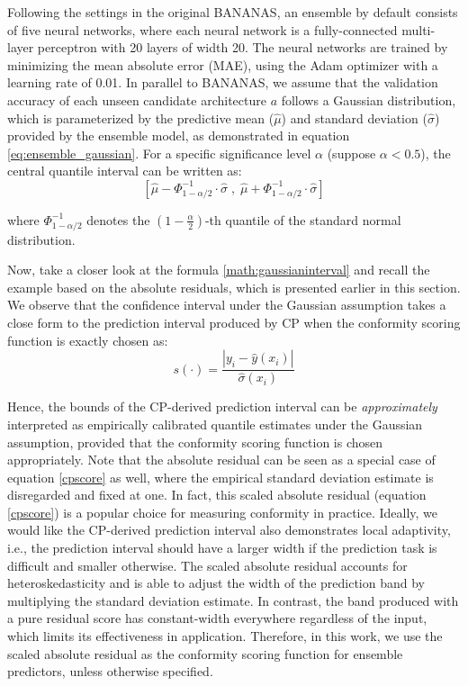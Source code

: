 \documentclass[a4paper,oneside,bibliography=totoc]{scrbook}
\begin{document}
{\begin{description}[leftmargin=0cm]
	\item [Ensemble Predictor] Following the settings in the original BANANAS, an ensemble by default consists of five neural networks, where each neural network is a fully-connected multi-layer perceptron with 20 layers of width 20. The neural networks are trained by minimizing the mean absolute error (MAE), using the Adam optimizer with a learning rate of 0.01. In parallel to BANANAS, we assume that the validation accuracy of each unseen candidate architecture $a$ follows a Gaussian distribution, which is parameterized by the predictive mean ($\hat{\mu}$) and standard deviation ($\hat{\sigma}$) provided by the ensemble model, as demonstrated in equation \ref{eq:ensemble_gaussian}. For a specific significance level $\alpha$ (suppose $\alpha<0.5$), the central quantile interval can be written as:
		\begin{equation}	
	\left[	
		\hat{\mu} - \Phi^{-1}_{1 - \alpha/2} \cdot \hat{\sigma}	\; ,\; 
		\hat{\mu} + \Phi^{-1}_{1 - \alpha/2} \cdot \hat{\sigma}
			\right]
		\label{math:gaussianinterval}
		\end{equation}
		
	where $\Phi^{-1}_{1 - \alpha/2}$ denotes the $(1-\frac{\alpha}{2})$-th quantile of the standard normal distribution. 
	
	Now, take a closer look at the formula \ref{math:gaussianinterval} and recall the example based on the absolute residuals, which is presented earlier in this section. We observe that the confidence interval under the Gaussian assumption takes a close form to the prediction interval produced by CP when the conformity scoring function is exactly chosen as:
		\begin{equation}
			s(\cdot) = \frac{|y_i - \hat{y}(x_i)|}{\hat\sigma(x_i)}
		\label{cpscore}
		\end{equation}
	
	Hence, the bounds of the CP-derived prediction interval can be \textit{approximately} interpreted as empirically calibrated quantile estimates under the Gaussian assumption, provided that the conformity scoring function is chosen appropriately. Note that the absolute residual can be seen as a special case of equation \ref{cpscore} as well, where the empirical standard deviation estimate is disregarded and fixed at one. In fact, this scaled absolute residual (equation \ref{cpscore}) is a popular choice for measuring conformity in practice. Ideally, we would like the CP-derived prediction interval also demonstrates local adaptivity, i.e., the prediction interval should have a larger width if the prediction task is difficult and smaller otherwise. The scaled absolute residual accounts for heteroskedasticity and is able to adjust the width of the prediction band by multiplying the standard deviation estimate. In contrast, the band produced with a pure residual score has constant-width everywhere regardless of the input, which limits its effectiveness in application. Therefore, in this work, we use the scaled absolute residual as the conformity scoring function for ensemble predictors, unless otherwise specified.
	

\end{description}}
\end{document}

